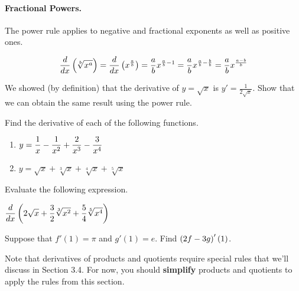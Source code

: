 \documentclass[12pt]{article}
\begin{document}
\newpage

\paragraph{Fractional Powers.} The power rule applies to negative and fractional exponents as well as positive ones.

$$\frac{d}{dx}\left(\sqrt[b]{x^a}\right)=\frac{d}{dx}\left( x^{\frac{a}{b}}\right)=\frac{a}{b}x^{\frac{a}{b}-1}=\frac{a}{b} x^{\frac{a}{b}-\frac{b}{b}}=\frac{a}{b}x^{\frac{a-b}{b}}$$

\vspace{5mm}

\Example We showed (by definition) that the derivative of $y=\sqrt{x}$ is $y'=\frac{1}{2\sqrt{x}}$. Show that we can obtain the same result using the power rule.

\vspace{20mm}

\Example Find the derivative of each of the following functions.

\begin{enumerate}
	\item[\tc{1}] $y=\displaystyle\frac{1}{x}-\frac{1}{x^2}+\frac{2}{x^3}-\frac{3}{x^4}$
	
	\vspace{20mm}
	
	\item[\tc{2}] $y=\sqrt{x}+\sqrt[3]{x}+\sqrt[4]{x}+\sqrt[5]{x}$
	
	\vspace{20mm}
	
\end{enumerate}


\Example Evaluate the following expression.

\vspace{5mm}

\hspace{10mm}$\displaystyle\frac{d}{dx}\left( 2\sqrt{x}+\frac{3}{2}\sqrt[3]{x^2}+\frac{5}{4} \sqrt[5]{x^4}\right)$

\vspace{50mm}

\Example Suppose that $f'(1)=\pi$ and $g'(1)=e$. Find $\left( 2f-3g\right) '(1)$.

\vspace{50mm}

Note that derivatives of products and quotients require special rules that we'll discuss in Section 3.4. For now, you should \textbf{simplify} products and quotients to apply the rules from this section.
\end{document}

